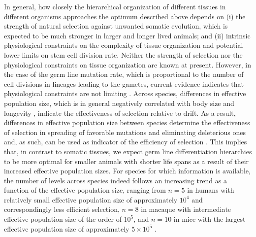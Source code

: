 \documentclass[aps,singlecolumn]{revtex4-1}
\begin{document}
In general, how closely the hierarchical organization of different
tissues in different organisms approaches the optimum described above
depends on (i) the strength of natural selection against unwanted somatic
evolution, which is expected to be much stronger in larger and longer
lived animals; and (ii) intrinsic physiological constraints on the
complexity of tissue organization and potential lower limits on stem
cell division rate. Neither the strength of selection nor the
physiological constraints on tissue organization are known at
present. However, in the case of the germ line mutation rate,
which is proportional to the number of cell divisions in lineages
leading to the gametes, current evidence indicates that physiological
constraints are not limiting \cite{Lynch:2012}.
Across species,
differences in effective population size, which is in general negatively
correlated with body size and longevity \cite{Nabholz:2013}, indicate
the effectiveness of selection relative to drift. As a result,
differences in effective population size between species determine the
effectiveness of selection in spreading of favorable
mutations and eliminating deleterious ones and, as such,
can be used as indicator of the efficiency of selection
\cite{Kimura:1983,Charlesworth:2009}.
This implies that, in contrast to somatic tissues,
we expect germ line differentiation hierarchies to be more optimal
for smaller animals with shorter life spans as a result of their
increased effective population sizes.
For species for which information is available, the number of
levels across species indeed follows an
increasing trend as a function of the effective population size,
ranging from $n=5$ in humans with relatively small
effective population size of approximately $10^4$
and correspondingly less efficient selection,
$n=8$ in macaque with intermediate effective population size of the
order of $10^5$, and
$n=10$ in mice with the largest effective population
size of approximately $5\times10^5$ \cite{Lynch:2010,Ramm:2014}.
\end{document}
